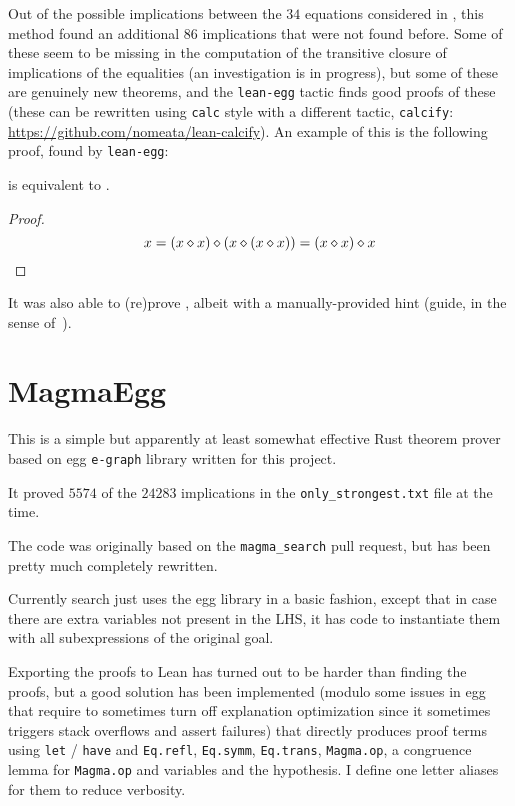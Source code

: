 Out of the possible implications between the $34$ equations considered in , this method found an additional 86 implications that were not found before.
Some of these seem to be missing in the computation of the transitive closure of implications of the equalities (an investigation is in progress), but some of these are genuinely new theorems, and the \texttt{lean-egg} tactic finds good proofs of these (these can be rewritten using \texttt{calc} style with a different tactic, \texttt{calcify}: \url{https://github.com/nomeata/lean-calcify}). An example of this is the following proof, found by \texttt{lean-egg}:

\begin{theorem}[14 implies 23]\label{14_implies_23} \leanok  {} is equivalent to .
\end{theorem}

\begin{proof}\leanok

$$ x = (x \diamond x) \diamond (x \diamond (x \diamond x)) = (x \diamond x) \diamond x $$
\end{proof}

It was also able to (re)prove , albeit with a manually-provided hint (guide, in the sense of~\cite{DBLP:journals/pacmpl/KoehlerGBGTS24}).

\section{MagmaEgg}

This is a simple but apparently at least somewhat effective Rust theorem prover based on egg \texttt{e-graph} library written for this project.

It proved $5574$ of the $24283$ implications in the \texttt{only\_strongest.txt} file at the time.

The code was originally based on the \texttt{magma\_search} pull request, but has been pretty much completely rewritten.

Currently search just uses the egg library in a basic fashion, except that in case there are extra variables not present in the LHS, it has code to instantiate them with all subexpressions of the original goal.

Exporting the proofs to Lean has turned out to be harder than finding the proofs, but a good solution has been implemented (modulo some issues in egg that require to sometimes turn off explanation optimization since it sometimes triggers stack overflows and assert failures) that directly produces proof terms using \texttt{let} / \texttt{have} and \texttt{Eq.refl}, \texttt{Eq.symm}, \texttt{Eq.trans}, \texttt{Magma.op}, a congruence lemma for \texttt{Magma.op} and variables and the hypothesis. I define one letter aliases for them to reduce verbosity.

